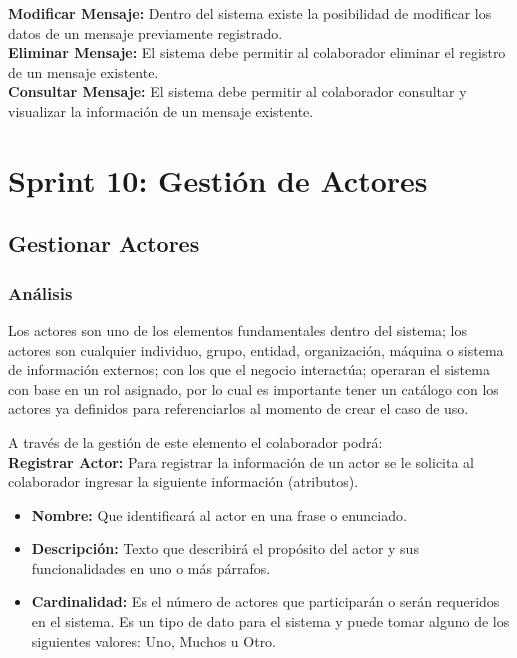 \textbf {Modificar Mensaje:}
Dentro del sistema existe la posibilidad de modificar los datos de un mensaje previamente registrado.\\

\textbf {Eliminar Mensaje:} 
El sistema debe permitir al colaborador eliminar el registro de un mensaje existente.\\

\textbf {Consultar Mensaje:} 
El sistema debe permitir al colaborador consultar y visualizar la información de un mensaje existente.\\


\section{Sprint 10: Gestión de Actores}

\subsection{Gestionar Actores}
\subsubsection {Análisis}

Los actores son uno de los elementos fundamentales dentro del sistema; los actores son cualquier individuo, grupo, entidad, organización, máquina o sistema de información externos; con los que el negocio interactúa; operaran el sistema con base en un rol asignado, por lo cual es importante tener un catálogo con los actores ya definidos para referenciarlos al momento de crear el caso de uso.

A través de la gestión de este elemento el colaborador podrá:\\

\textbf {Registrar Actor:}
Para registrar la información de un actor se le solicita al colaborador ingresar la siguiente información (atributos).
\begin{itemize}
	\item \textbf{Nombre:} Que identificará al actor en una frase o enunciado.
	\item \textbf{Descripción:} Texto que describirá el propósito del actor y sus funcionalidades en uno o más párrafos.
	\item \textbf{Cardinalidad:} Es el número de actores que participarán o serán requeridos en el sistema. Es un tipo de dato para el sistema y puede tomar alguno de los siguientes valores: Uno, Muchos u Otro.
\end{itemize}

